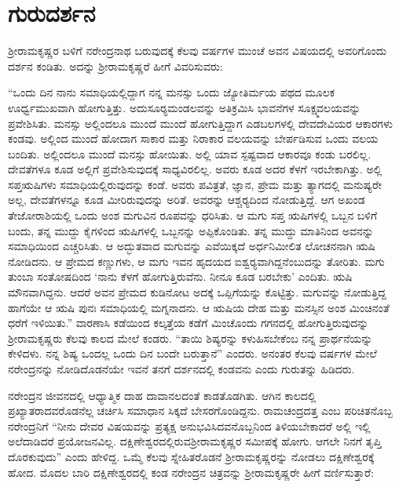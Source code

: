 
\chapter{ಗುರುದರ್ಶನ}

ಶ‍್ರೀರಾಮಕೃಷ್ಣರ ಬಳಿಗೆ ನರೇಂದ್ರನಾಥ ಬರುವುದಕ್ಕೆ ಕೆಲವು ವರ್ಷಗಳ ಮುಂಚೆ ಅವನ ವಿಷಯದಲ್ಲಿ ಅವರಿಗೊಂದು ದರ್ಶನ ಕಂಡಿತು. ಅದನ್ನು ಶ‍್ರೀರಾಮಕೃಷ್ಣರೆ ಹೀಗೆ ವಿವರಿಸುವರು:

“ಒಂದು ದಿನ ನಾನು ಸಮಾಧಿಯಲ್ಲಿದ್ದಾಗ ನನ್ನ ಮನಸ್ಸು ಒಂದು ಜ್ಯೋತಿರ್ಮಯ ಪಥದ ಮೂಲಕ ಊರ್ಧ್ವಮುಖವಾಗಿ ಹೋಗುತ್ತಿತ್ತು. ಅದು\break ಸೂರ‍್ಯಮಂಡಲವನ್ನು ಅತಿಕ್ರಮಿಸಿ ಭಾವನೆಗಳ ಸೂಕ್ಷ್ಮವಲಯವನ್ನು ಪ್ರವೇಶಿಸಿತು. ಮನಸ್ಸು ಅಲ್ಲಿಂದಲೂ ಮುಂದೆ ಮುಂದೆ ಹೋಗುತ್ತಿದ್ದಾಗ ಎಡಬಲಗಳಲ್ಲಿ ದೇವದೇವಿಯರ ಆಕಾರಗಳು ಕಂಡವು. ಅಲ್ಲಿಂದ ಮುಂದೆ ಹೋದಾಗ ಸಾಕಾರ ಮತ್ತು ನಿರಾಕಾರ ವಲಯವನ್ನು ಬೇರ್ಪಡಿಸುವ ಒಂದು ವಲಯ ಬಂದಿತು. ಅಲ್ಲಿಂದಲೂ ಮುಂದೆ ಮನಸ್ಸು ಹೋಯಿತು. ಅಲ್ಲಿ ಯಾವ ಸ್ಪಷ್ಟವಾದ ಆಕಾರವೂ ಕಂಡು ಬರಲಿಲ್ಲ. ದೇವತೆಗಳೂ ಕೂಡ ಅಲ್ಲಿಗೆ ಪ್ರವೇಶಿಸುವುದಕ್ಕೆ ಸಾಧ್ಯವಿರಲಿಲ್ಲ. ಅವರು ಕೂಡ ಅದರ ಕೆಳಗೆ ಇರಬೇಕಾಗಿತ್ತು. ಅಲ್ಲಿ ಸಪ್ತಋಷಿಗಳು ಸಮಾಧಿಯಲ್ಲಿರುವುದನ್ನು ಕಂಡೆ. ಅವರು ಪವಿತ್ರತೆ, ಜ್ಞಾನ, ಪ್ರೇಮ ಮತ್ತು ತ್ಯಾಗದಲ್ಲಿ ಮನುಷ್ಯರೇ ಅಲ್ಲ, ದೇವತೆಗಳನ್ನೂ ಕೂಡ ಮೀರಿರುವುದನ್ನು ಅರಿತೆ. ಅವರನ್ನು ಆಶ್ಚರ‍್ಯದಿಂದ ನೋಡುತ್ತಿದ್ದೆ. ಆಗ ಅಖಂಡ ತೇಜೋರಾಶಿಯಲ್ಲಿ ಒಂದು ಅಂಶ ಮಗುವಿನ ರೂಪವನ್ನು ಧರಿಸಿತು. ಆ ಮಗು ಸಪ್ತ ಋಷಿಗಳಲ್ಲಿ ಒಬ್ಬನ ಬಳಿಗೆ ಬಂದು, ತನ್ನ ಮುದ್ದು ಕೈಗಳಿಂದ ಋಷಿಗಳಲ್ಲಿ ಒಬ್ಬನನ್ನು ಅಪ್ಪಿಕೊಂಡಿತು. ತನ್ನ ಮುದ್ದು ಮಾತಿನಿಂದ ಅವನನ್ನು ಸಮಾಧಿಯಿಂದ ಎಚ್ಚರಿಸಿತು. ಆ ಅದ್ಭುತವಾದ ಮಗುವನ್ನು ಎವೆಯಿಕ್ಕದೆ ಅರ್ಧನಿಮೀಲಿತ ಲೋಚನನಾಗಿ ಋಷಿ ನೋಡಿದನು. ಆ ಪ್ರೇಮದ ಕಣ್ಣುಗಳು, ಆ ಮಗು ಇವನ ಹೃದಯದ ಐಶ್ವರ‍್ಯವಾಗಿದ್ದನೆಂಬುದನ್ನು ತೋರಿತು. ಮಗು ತುಂಬಾ ಸಂತೋಷದಿಂದ ‘ನಾನು ಕೆಳಗೆ ಹೋಗುತ್ತಿರುವೆನು. ನೀನೂ ಕೂಡ ಬರಬೇಕು’ ಎಂದಿತು. ಋಷಿ ಮೌನವಾಗಿದ್ದನು. ಆದರೆ ಅವನ ಪ್ರೇಮದ ಕುಡಿನೋಟ ಅದಕ್ಕೆ ಒಪ್ಪಿಗೆಯನ್ನು ಕೊಟ್ಟಿತ್ತು. ಮಗುವನ್ನು ನೋಡುತ್ತಿದ್ದ ಹಾಗೆಯೇ ಆ ಋಷಿ ಪುನಃ ಸಮಾಧಿಯಲ್ಲಿ ಮಗ್ನನಾದನು. ಆ ಋಷಿಯ ದೇಹ ಮತ್ತು ಮನಸ್ಸಿನ ಅಂಶ ಮಿಂಚಿನಂತೆ ಧರೆಗೆ ಇಳಿಯಿತು.” ವಾರಣಾಸಿ ಕಡೆಯಿಂದ ಕಲ್ಕತ್ತೆಯ ಕಡೆಗೆ ಮಿಂಚೊಂದು ಗಗನದಲ್ಲಿ ಹೋಗುತ್ತಿರುವುದನ್ನು ಶ‍್ರೀರಾಮಕೃಷ್ಣರು ಕೆಲವು ಕಾಲದ ಮೇಲೆ ಕಂಡರು. “ತಾಯಿ ಶಿಷ್ಯರನ್ನು ಕಳುಹಿಸಬೇಕೆಂಬ ನನ್ನ ಪ್ರಾರ್ಥನೆಯನ್ನು ಕೇಳಿದಳು. ನನ್ನ ಶಿಷ್ಯ ಒಂದಲ್ಲ ಒಂದು ದಿನ ಬಂದೇ ಬರುತ್ತಾನೆ” ಎಂದರು. ಅನಂತರ ಕೆಲವು ವರ್ಷಗಳ ಮೇಲೆ ನರೇಂದ್ರನನ್ನು ನೋಡಿದೊಡನೆಯೇ ಇವನೆ ತನಗೆ ದರ್ಶನದಲ್ಲಿ ಕಂಡವನು ಎಂದು ಗುರುತನ್ನು ಹಿಡಿದರು.

ನರೇಂದ್ರನ ಜೀವನದಲ್ಲಿ ಆಧ್ಯಾತ್ಮಿಕ ದಾಹ ದಾವಾನಲದಂತೆ ಕಾಡತೊಡಗಿತು. ಆಗಿನ ಕಾಲದಲ್ಲಿ ಪ್ರಖ್ಯಾತರಾದವರೊಡನೆಲ್ಲ ಚರ್ಚಿಸಿ ಸಮಾಧಾನ ಸಿಕ್ಕದೆ ಬೇಸರಗೊಂಡಿದ್ದನು. ರಾಮಚಂದ್ರದತ್ತ ಎಂಬ ಪರಿಚಿತನೊಬ್ಬ ನರೇಂದ್ರನಿಗೆ “ನೀನು ದೇವರ ವಿಷಯವನ್ನು ಪ್ರತ್ಯಕ್ಷ ಅನುಭವಿಸಿದವನೊಬ್ಬನಿಂದ ತಿಳಿಯಬೇಕಾದರೆ ಅಲ್ಲಿ ಇಲ್ಲಿ ಅಲೆದಾಡಿದರೆ ಪ್ರಯೋಜನವಿಲ್ಲ. ದಕ್ಷಿಣೇಶ್ವರದಲ್ಲಿರುವ\break ಶ‍್ರೀರಾಮಕೃಷ್ಣರ ಸಮೀಪಕ್ಕೆ ಹೋಗು. ಆಗಲೇ ನಿನಗೆ ತೃಪ್ತಿ ದೊರಕುವುದು” ಎಂದು ಹೇಳಿದ್ದ. ಒಮ್ಮೆ ಕೆಲವು ಸ್ನೇಹಿತರೊಡನೆ ಶ‍್ರೀರಾಮಕೃಷ್ಣರನ್ನು ನೋಡಲು ದಕ್ಷಿಣೇಶ್ವರಕ್ಕೆ ಹೋದ. ಮೊದಲ ಬಾರಿ ದಕ್ಷಿಣೇಶ್ವರದಲ್ಲಿ ಕಂಡ ನರೇಂದ್ರನ ಚಿತ್ರವನ್ನು ಶ‍್ರೀರಾಮಕೃಷ್ಣರೇ ಹೀಗೆ ವರ್ಣಿಸುತ್ತಾರೆ:

